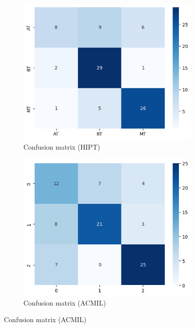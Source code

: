 \documentclass[
11pt, %
english, %
singlespacing, %
headsepline, %
]{project_structure}
\begin{document}
\begin{figure}[ht]
     \centering
     \begin{subfigure}[b]{0.45\textwidth}
         \centering
         \includegraphics[width=\textwidth]{figures/expirements_and_results/hipt_cm.png}
         \caption{Confusion matrix (HIPT)}
     \end{subfigure}
     \hfill
     \begin{subfigure}[b]{0.45\textwidth}
         \centering
         \includegraphics[width=\textwidth]{figures/expirements_and_results/acmil_cm.png}
         \caption{Confusion matrix (ACMIL)}
     \end{subfigure}
\end{figure}
\end{document}
